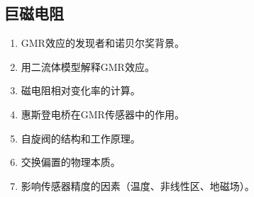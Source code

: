 \documentclass[12pt,a4paper]{article}
\begin{document}
\subsection*{巨磁电阻}
\begin{enumerate}
    \item GMR效应的发现者和诺贝尔奖背景。
    \item 用二流体模型解释GMR效应。
    \item 磁电阻相对变化率的计算。
    \item 惠斯登电桥在GMR传感器中的作用。
    \item 自旋阀的结构和工作原理。
    \item 交换偏置的物理本质。
    \item 影响传感器精度的因素（温度、非线性区、地磁场）。
\end{enumerate}
\end{document}
